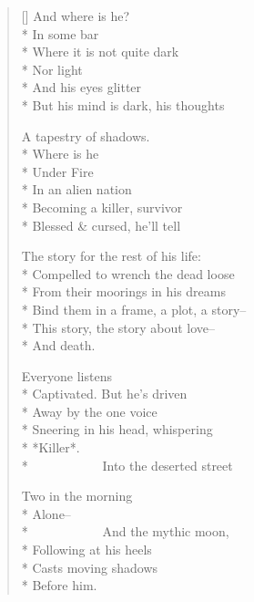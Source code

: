 \label{ch:under_fire}
\settowidth{\versewidth}{Bind them in a frame, a plot, a story--}
\begin{verse}[\versewidth]
And where is he?\\*
In some bar\\*
Where it is not quite dark\\*
Nor light\\*
And his eyes glitter\\*
But his mind is dark, his thoughts

A tapestry of shadows.\\*
Where is he\\*
Under Fire\\*
In an alien nation\\*
Becoming a killer, survivor\\*
Blessed \& cursed, he'll tell

The story for the rest of his life:\\*
Compelled to wrench the dead loose\\*
From their moorings in his dreams\\*
Bind them in a frame, a plot, a story--\\*
This story, the story about love--\\*
And death.

Everyone listens\\*
Captivated. But he's driven\\*
Away by the one voice\\*
Sneering in his head, whispering\\*
*Killer*.\\*
             Into the deserted street

Two in the morning\\*
Alone--\\*
             And the mythic moon,\\*
Following at his heels\\*
Casts moving shadows\\*
Before him.
\end{verse}
